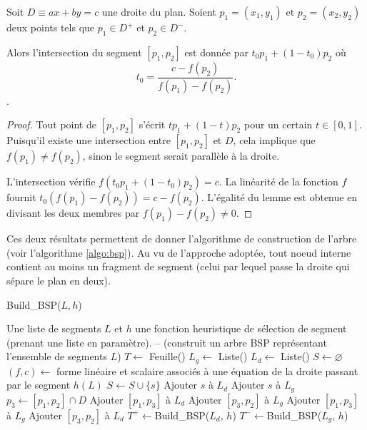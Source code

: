 \begin{lem}
  Soit $D\equiv ax + by = c$ une droite du plan. Soient $p_1 = (x_1, y_1)$
  et $p_2 = (x_2, y_2)$ deux points tels que $p_1\in D^+$ et $p_2\in D^-$.

  Alors l'intersection du segment $[p_1, p_2]$ est donnée par $t_0p_1 + (1-t_0)p_2$
  où $$t_0 = \frac{c-f(p_2)}{f(p_1)-f(p_2)}.$$.
\end{lem}
\begin{proof}
  Tout point de $[p_1, p_2]$ s'écrit $tp_1 + (1-t)p_2$ pour un certain
  $t\in [0, 1]$. Puisqu'il existe une intersection entre $[p_1, p_2]$ et
  $D$, cela implique que $f(p_1)\neq f(p_2)$, sinon le segment serait
  parallèle à la droite.

  L'intersection vérifie $f(t_0p_1 + (1-t_0)p_2) = c$. La linéarité de la
  fonction $f$ fournit $t_0(f(p_1) - f(p_2)) = c - f(p_2)$. L'égalité
  du lemme est  obtenue en divisant les deux membres par $f(p_1) - f(p_2)\neq 0$.
\end{proof}

Ces deux résultats permettent de donner l'algorithme de construction de
l'arbre (voir l'algorithme \ref{algo:bsp}). Au vu de l'approche adoptée,
tout noeud interne contient au moins un fragment de segment (celui
par lequel passe la droite qui sépare le plan en deux).

\begin{algorithm}
  \caption{Build\_BSP($L, h$)}
  \begin{algorithmic}[1] \label{algo:bsp}
    \REQUIRE Une liste de segments $L$ et $h$ une fonction
    heuristique de sélection de segment (prenant une liste en paramètre).
    \ENSURE -- (construit un arbre BSP représentant l'ensemble de segments $L$)
    \STATE $T\leftarrow$ Feuille()
    \STATE $L_g\leftarrow$ Liste()
    \STATE $L_d\leftarrow$ Liste()
    \STATE $S \leftarrow \varnothing$
    \STATE $\left(f, c\right)\leftarrow$ forme linéaire et scalaire
    associés à une équation de la droite passant par le segment $h(L)$
     \label{bsp:for}
    \STATE $S\leftarrow S\cup\{s\}$
    \STATE Ajouter $s$ à $L_d$
    \STATE Ajouter $s$ à $L_g$
    \ELSE
    \STATE $p_3\leftarrow [p_1, p_2]\cap D$
    \STATE Ajouter $[p_1, p_3]$ à $L_d$
    \STATE Ajouter $[p_3, p_2]$ à $L_g$
    \ELSE
    \STATE Ajouter $[p_1, p_3]$ à $L_g$
    \STATE Ajouter $[p_3, p_2]$ à $L_d$
    \ENDIF
    \ENDIF
    \ENDFOR
    \STATE $T^+\leftarrow$Build\_BSP($L_d$, $h$)
    \STATE $T^-\leftarrow$Build\_BSP($L_g$, $h$)
    \ENDIF
  \end{algorithmic}
\end{algorithm}

